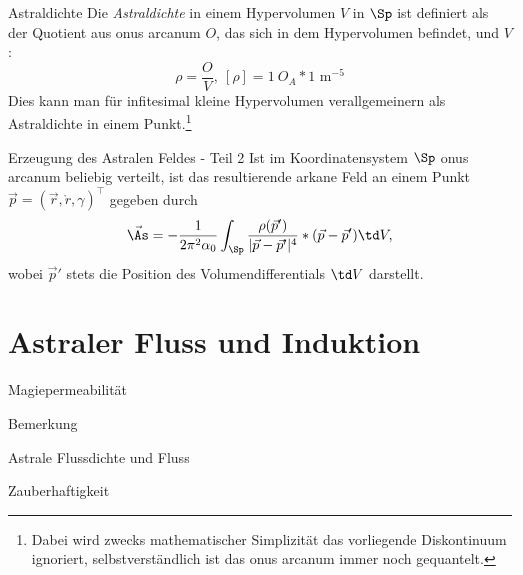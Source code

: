 \begin{bla}{Astraldichte}
Die \emph{Astraldichte} in einem Hypervolumen $V$ in $\Sp$ ist definiert als der Quotient aus onus arcanum $O$, das sich in dem Hypervolumen befindet, und $V$:
\begin{equation}
\rho=\frac{O}{V},\ [\rho]=1\ O_A*1\text{ m}^{-5}
\end{equation}
Dies kann man für infitesimal kleine Hypervolumen verallgemeinern als Astraldichte in einem Punkt.\footnote{Dabei wird zwecks mathematischer Simplizität das vorliegende Diskontinuum ignoriert, selbstverständlich ist das onus arcanum immer noch gequantelt.}
\end{bla}
\begin{bla}{Erzeugung des Astralen Feldes - Teil 2}
Ist im Koordinatensystem $\Sp$ onus arcanum beliebig verteilt, ist das resultierende arkane Feld an einem Punkt $\vec{p}=(\vec{r},\mathring{r},\gamma)^\top$ gegeben durch
\begin{equation}
\vec{\As}=-\frac{1}{2\pi^2\alpha_0}\int_\Sp\frac{\rho(\vec{p}')}{|\vec{p}-\vec{p}'|^4}*(\vec{p}-\vec{p}')\td V,
\end{equation}
wobei $\vec{p}'$ stets die Position des Volumendifferentials $\td V$ darstellt.
\end{bla}
\section{Astraler Fluss und Induktion}
\begin{bla}{Magiepermeabilität}

\end{bla}
\begin{bla}{Bemerkung}
\end{bla}
\begin{bla}{Astrale Flussdichte und Fluss}

\end{bla}
\begin{bla}{Zauberhaftigkeit}
\end{bla}